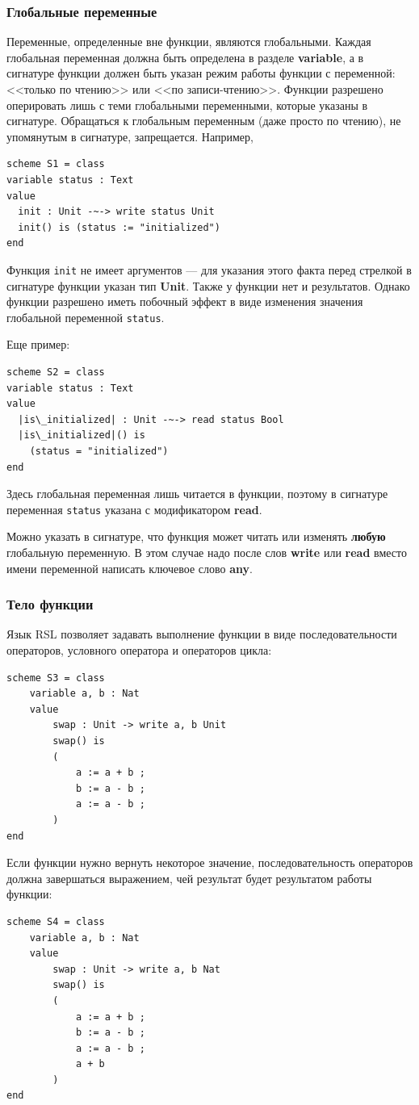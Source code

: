 \documentclass[14pt, twoside]{extreport}
\newcommand{\head}[1]{\vspace{1cm}\subsubsection*{#1}}
\begin{document}
\head{Глобальные переменные}
Переменные, определенные вне функции, являются глобальными.
Каждая глобальная переменная должна быть определена в разделе \textbf{variable}, а в сигнатуре функции должен быть указан режим работы функции с переменной: <<только по чтению>> или <<по записи-чтению>>. Функции разрешено оперировать лишь с теми глобальными переменными, которые указаны в сигнатуре. Обращаться к глобальным переменным (даже просто по чтению), не упомянутым в сигнатуре, запрещается. Например,
\begin{lstlisting}
scheme S1 = class
variable status : Text
value
  init : Unit -~-> write status Unit
  init() is (status := "initialized")	
end
\end{lstlisting}

Функция \texttt{init} не имеет аргументов --- для указания этого факта перед стрелкой в сигнатуре функции указан тип \textbf{Unit}. Также у функции нет и результатов. Однако функции разрешено иметь побочный эффект в виде изменения значения глобальной переменной \texttt{status}.

Еще пример:
\begin{lstlisting}[escapechar={|}]
scheme S2 = class
variable status : Text
value
  |is\_initialized| : Unit -~-> read status Bool
  |is\_initialized|() is
	(status = "initialized")	
end
\end{lstlisting}

Здесь глобальная переменная лишь читается в функции, поэтому в сигнатуре переменная \texttt{status} указана с модификатором \textbf{read}.

Можно указать в сигнатуре, что функция может читать или изменять \textbf{любую} глобальную переменную. В этом случае надо после слов \textbf{write} или \textbf{read} вместо имени переменной написать ключевое слово \textbf{any}.

\head{Тело функции}
Язык RSL позволяет задавать выполнение функции в виде последовательности операторов, условного оператора и операторов цикла:
\begin{lstlisting}
scheme S3 = class
	variable a, b : Nat
	value
		swap : Unit -> write a, b Unit
		swap() is
		(
			a := a + b ;
			b := a - b ;
			a := a - b ;
		)
end
\end{lstlisting}

Если функции нужно вернуть некоторое значение, последовательность операторов должна завершаться выражением, чей результат будет результатом работы функции:
\begin{lstlisting}
scheme S4 = class
	variable a, b : Nat
	value
		swap : Unit -> write a, b Nat
		swap() is
		(
			a := a + b ;
			b := a - b ;
			a := a - b ;
			a + b
		)
end
\end{lstlisting}
\end{document}
